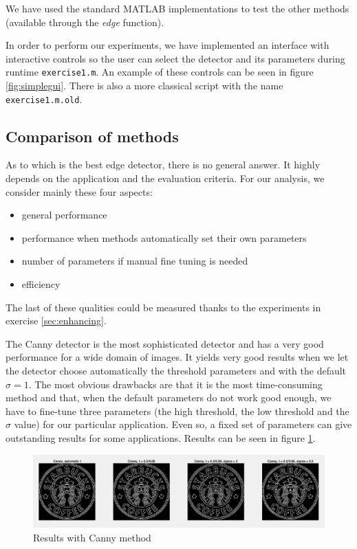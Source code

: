 We have used the standard MATLAB implementations to test the other methods (available through the \emph{edge} function).

In order to perform our experiments, we have implemented an interface with interactive controls so the user can select the detector and its parameters during runtime \texttt{exercise1.m}. An example of these controls can be seen in figure \ref{fig:simplegui}. There is also a more classical script with the name \texttt{exercise1.m.old}.

\subsection{Comparison of methods}

As to which is the best edge detector, there is no general answer. It highly depends on the application and the evaluation criteria. For our analysis, we consider mainly these four aspects: 
\begin{itemize}
	\item general performance
	\item performance when methods automatically set their own parameters
	\item number of parameters if manual fine tuning is needed
	\item efficiency
\end{itemize}
The last of these qualities could be measured thanks to the experiments in exercise \ref{sec:enhancing}.

The Canny detector is the most sophisticated detector and has a very
good performance for a wide domain of images. It yields very good results when we let the detector
choose automatically the threshold parameters and with the default $\sigma = 1$. The most obvious
drawbacks are that it is the most time-consuming method and that, when the default parameters do not
work good enough, we have to fine-tune three parameters (the high threshold, the low threshold and the $\sigma$ value) for our particular application. Even so, a fixed set of parameters can give
outstanding results for some applications. Results can be seen in figure \ref{fig:im6}. 

\begin{figure}[!hbt]
  \includegraphics[width=\textwidth]{./img/ex1/im6.png}
  \caption{Results with Canny method}
  \label{fig:im6}
\end{figure}

